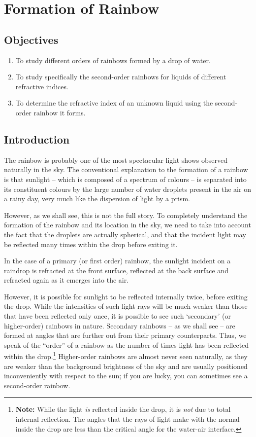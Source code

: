 \chapter{Formation of Rainbow}

\section*{Objectives}

\begin{enumerate}
\item To study different orders of rainbows formed by a drop of water.
\item To study specifically the second-order rainbows for liquids of different refractive indices.
\item To determine the refractive index of an unknown liquid using the second-order rainbow it forms.
\end{enumerate}


\section*{Introduction}
The rainbow is probably one of the most spectacular light shows observed naturally in the sky. The conventional explanation to the formation of a rainbow is that sunlight -- which is composed of a spectrum of colours -- is separated into its constituent colours by the large number of water droplets present in the air on a rainy day, very much like the dispersion of light by a prism. 

However, as we shall see, this is not the full story. To completely understand the formation of the rainbow and its location in the sky, we need to take into account the fact that the droplets are actually spherical, and that the incident light may be reflected many times within the drop before exiting it.

In the case of a primary (or first order) rainbow, the sunlight incident on a raindrop is refracted at the front surface, reflected at the back surface and refracted again as it emerges into the air. 

However, it is possible for sunlight to be reflected internally twice, before exiting the drop. While the intensities of such light rays will be much weaker than those that have been reflected only once, it is possible to see such `secondary' (or higher-order) rainbows in nature. Secondary rainbows -- as we shall see -- are formed at angles that are further out from their primary counterparts. Thus, we speak of the ``order'' of a rainbow as the number of times light has been reflected within the drop.\footnote{\textbf{Note:} While the light \textit{is} reflected inside the drop, it is \textit{not} due to total internal reflection. The angles that the rays of light make with the normal inside the drop are less than the critical angle for the water-air interface.} Higher-order rainbows are almost never seen naturally, as they are weaker than the background brightness of the sky and are usually positioned inconveniently with respect to the sun; if you are lucky, you can sometimes see a second-order rainbow. 

